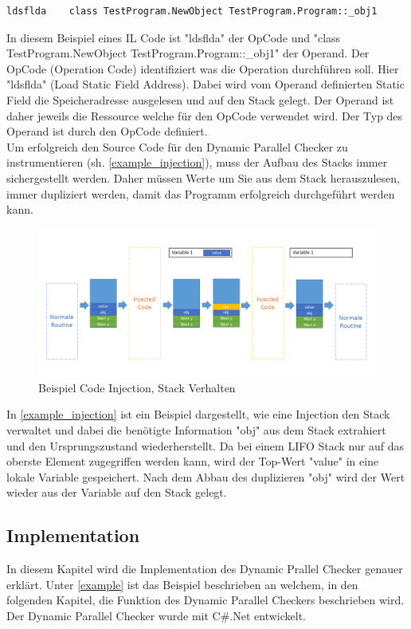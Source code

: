 \documentclass[10pt,a4paper]{article}
\begin{document}
\begin{flushleft}
\begin{lstlisting}
ldsflda    class TestProgram.NewObject TestProgram.Program::_obj1
\end{lstlisting}
In diesem Beispiel eines IL Code ist "ldsflda" der OpCode und "class TestProgram.NewObject TestProgram.Program::\_obj1" der Operand. Der OpCode (Operation Code) identifiziert was die Operation durchführen soll. Hier "ldsflda" (Load Static Field Address). Dabei wird vom Operand definierten Static Field die Speicheradresse ausgelesen und auf den Stack gelegt. Der Operand ist daher jeweils die Ressource welche für den OpCode verwendet wird. Der Typ des Operand ist durch den OpCode definiert.\\
Um erfolgreich den Source Code für den Dynamic Parallel Checker zu instrumentieren (sh. \autoref{example_injection}), muss der Aufbau des Stacks immer sichergestellt werden. Daher müssen Werte um Sie aus dem Stack herauszulesen, immer dupliziert werden, damit das Programm erfolgreich durchgeführt werden kann.\\
\begin{figure}[H]
\centering
\includegraphics[scale=0.5]{images/BeispielInjection.png}
\caption{Beispiel Code Injection, Stack Verhalten}
\label{example_injection}
\end{figure}
In \autoref{example_injection} ist ein Beispiel dargestellt, wie eine Injection den Stack verwaltet und dabei die benötigte Information "obj" aus dem Stack extrahiert und den Ursprungszustand wiederherstellt. Da bei einem LIFO Stack nur auf das oberste Element zugegriffen werden kann, wird der Top-Wert "value" in eine lokale Variable gespeichert. Nach dem Abbau des duplizieren "obj" wird der Wert wieder aus der Variable auf den Stack gelegt.
\end{flushleft}
\subsection{Implementation}\label{implementation}
In diesem Kapitel wird die Implementation des Dynamic Prallel Checker genauer erklärt. Unter \ref{example} ist das Beispiel beschrieben an welchem, in den folgenden Kapitel, die Funktion des Dynamic Parallel Checkers beschrieben wird. Der Dynamic Parallel Checker wurde mit C\#.Net entwickelt.
\newpage
\end{document}
